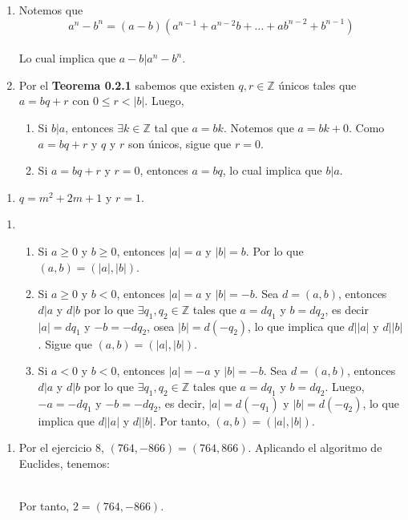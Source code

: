 \documentclass[11pt]{article}
\newcommand{\Z}{\mathbb{Z}}
\begin{document}
\begin{enumerate}[start=5]
  \item Notemos que \[ a^n-b^n = (a-b)(a^{n-1}+ a^{n-2}b+ \ldots + ab^{n-2} + b^{n-1}) \] \\
  Lo cual implica que $a-b|a^n-b^n$.
  \item Por el \textbf{Teorema 0.2.1} sabemos que existen $q,r \in \Z$ únicos tales que $a=bq+r$ con $0 \leq r < |b|$. Luego,
    \begin{enumerate}[label=\roman*)]
      \item Si $b|a$, entonces $\exists k \in \Z$ tal que $a=bk$. Notemos que $a=bk+0$. Como $a=bq+r$ y $q$ y $r$ son únicos, sigue que $r=0$.
      \item Si $a=bq+r$ y $r=0$, entonces $a=bq$, lo cual implica que $b|a$.
    \end{enumerate}
\end{enumerate}

\begin{enumerate}[label=7.10]
  \item $q=m^2+2m+1$ y $r=1$.
\end{enumerate}

\begin{enumerate}[start=8]
  \item
  \begin{enumerate}[label=\roman*)]
    \item Si $ a \geq 0$ y $b \geq 0$, entonces $|a|=a$ y $|b|=b$. Por lo que $(a,b)=(|a|,|b|)$.
    \item Si $a \geq 0$ y  $b<0$, entonces $|a|=a$ y $|b|=-b$. Sea $d=(a,b)$, entonces $d|a$ y $d|b$ por lo que $\exists q_1, q_2\in \Z$ tales que $a=dq_1$ y $b=dq_2$, es decir $|a|=dq_1$ y $-b=-dq_2$, osea $|b|=d(-q_2)$, lo que implica que $d \Big| |a|$ y $d \Big| |b|$. Sigue que $(a,b)=(|a|,|b|)$.
    \item Si $a<0$ y $b<0$, entonces $|a|=-a$ y $|b|=-b$.  Sea $d=(a,b)$, entonces $d|a$ y $d|b$ por lo que $\exists q_1, q_2\in \Z$ tales que $a=dq_1$ y $b=dq_2$. Luego, $-a=-dq_1$ y $-b=-dq_2$, es decir, $|a|=d(-q_1)$ y $|b|=d(-q_2)$, lo que implica que $d \Big| |a|$ y $d \Big| |b|$. Por tanto, $(a,b)=(|a|,|b|)$.
  \end{enumerate} 
\end{enumerate}

\begin{enumerate}[label=9.5]
  \item Por el ejercicio $8$, $(764,-866)=(764,866)$. Aplicando el algoritmo de Euclides, tenemos:
  \vspace{0.5 cm}

  \quad
  \quad
  \quad
   \\
  Por tanto, $2=(764,-866)$.
\end{enumerate}
\end{document}
